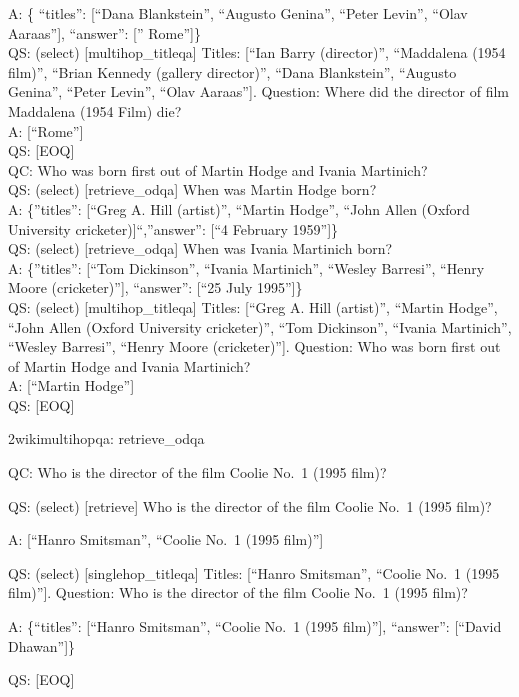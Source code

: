\documentclass[
]{article}
\begin{document}
A: \{ ``titles'': {[}``Dana Blankstein'', ``Augusto Genina'', ``Peter
Levin'', ``Olav Aaraas''{]}, ``answer'': {[}'' Rome''{]}\}\\
QS: (select) {[}multihop\_titleqa{]} Titles: {[}``Ian Barry
(director)'', ``Maddalena (1954 film)'', ``Brian Kennedy (gallery
director)'', ``Dana Blankstein'', ``Augusto Genina'', ``Peter Levin'',
``Olav Aaraas''{]}. Question: Where did the director of film Maddalena
(1954 Film) die?\\
A: {[}``Rome''{]}\\
QS: {[}EOQ{]}\\
QC: Who was born first out of Martin Hodge and Ivania Martinich?\\
QS: (select) {[}retrieve\_odqa{]} When was Martin Hodge born?\\
A: \{''titles'': {[}``Greg A. Hill (artist)'', ``Martin Hodge'', ``John
Allen (Oxford University cricketer){]}``,''answer'': {[}``4 February
1959''{]}\}\\
QS: (select) {[}retrieve\_odqa{]} When was Ivania Martinich born?\\
A: \{''titles'': {[}``Tom Dickinson'', ``Ivania Martinich'', ``Wesley
Barresi'', ``Henry Moore (cricketer)''{]}, ``answer'': {[}``25 July
1995''{]}\}\\
QS: (select) {[}multihop\_titleqa{]} Titles: {[}``Greg A. Hill
(artist)'', ``Martin Hodge'', ``John Allen (Oxford University
cricketer)'', ``Tom Dickinson'', ``Ivania Martinich'', ``Wesley
Barresi'', ``Henry Moore (cricketer)''{]}. Question: Who was born first
out of Martin Hodge and Ivania Martinich?\\
A: {[}``Martin Hodge''{]}\\
QS: {[}EOQ{]}

2wikimultihopqa: retrieve\_odqa

QC: Who is the director of the film Coolie No.~1 (1995 film)?

QS: (select) {[}retrieve{]} Who is the director of the film Coolie No.~1
(1995 film)?

A: {[}``Hanro Smitsman'', ``Coolie No.~1 (1995 film)''{]}

QS: (select) {[}singlehop\_titleqa{]} Titles: {[}``Hanro Smitsman'',
``Coolie No.~1 (1995 film)''{]}. Question: Who is the director of the
film Coolie No.~1 (1995 film)?

A: \{``titles'': {[}``Hanro Smitsman'', ``Coolie No.~1 (1995 film)''{]},
``answer'': {[}``David Dhawan''{]}\}

QS: {[}EOQ{]}
\end{document}
